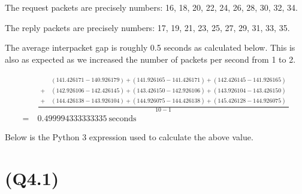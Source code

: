 The request packets are precisely numbers: 16, 18, 20, 22, 24, 26, 28,
30, 32, 34.

The reply packets are precisely numbers: 17, 19, 21, 23, 25, 27, 29, 31,
33, 35.

The average interpacket gap is roughly 0.5 seconds as calculated below.
This is also as expected as we increased the number of packets per
second from 1 to 2.

\[
\begin{aligned}
&\frac{
\begin{aligned}
&(141.426171 - 140.926179)
+(141.926165 - 141.426171)
+(142.426145 - 141.926165)\\
+\ &(142.926106 - 142.426145)
+(143.426150 - 142.926106)
+(143.926104 - 143.426150)\\
+\ &(144.426138 - 143.926104)
+(144.926075 - 144.426138)
+(145.426128 - 144.926075)
\end{aligned}
}{10 - 1}\\
=\ & 0.499994333333335\ \text{seconds}
\end{aligned}
\]

Below is the Python 3 expression used to calculate the above value.

\begin{Shaded}
\begin{Highlighting}[]
\NormalTok{((} \OperatorTok{{-}} \NormalTok{)}
\OperatorTok{+}\NormalTok{(} \OperatorTok{{-}} \NormalTok{)}
\OperatorTok{+}\NormalTok{(} \OperatorTok{{-}} \NormalTok{)}
\OperatorTok{+}\NormalTok{(} \OperatorTok{{-}} \NormalTok{)}
\OperatorTok{+}\NormalTok{(} \OperatorTok{{-}} \NormalTok{)}
\OperatorTok{+}\NormalTok{(} \OperatorTok{{-}} \NormalTok{)}
\OperatorTok{+}\NormalTok{(} \OperatorTok{{-}} \NormalTok{)}
\OperatorTok{+}\NormalTok{(} \OperatorTok{{-}} \NormalTok{)}
\OperatorTok{+}\NormalTok{(} \OperatorTok{{-}} \NormalTok{))}\OperatorTok{/}
\end{Highlighting}
\end{Shaded}

\hypertarget{q4.1}{%
\section{(Q4.1)}\label{q4.1}}

